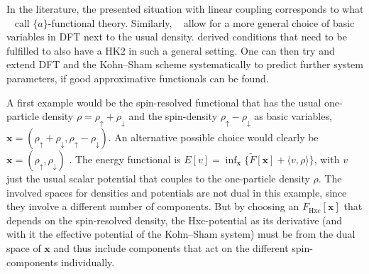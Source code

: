 \documentclass[journal=apcach,manuscript=article,layout=twocolumn]{achemso}
\newcommand{\FHxc}{F_\mathrm{Hxc}}
\newcommand{\xx}{\mathbf{x}}
\newcommand{\changed}[1] {{ {#1}}} %
\begin{document}
In the literature, the presented situation with linear coupling corresponds to what \citeauthor{Schoenhammer1995}~\cite{Schoenhammer1995} call $\{a\}$-functional theory.
Similarly, \citeauthor{higuchi2004arbitrary}~\cite{higuchi2004arbitrary,higuchi2004arbitrary2} allow for a more general choice of basic variables in DFT next to the usual density. 
\changed{\citet{xu2022extensibility} derived conditions that need to be fulfilled to also have a HK2 in such a general setting.}
\changed{One can then try and} extend DFT and the Kohn--Sham scheme systematically to predict further system parameters, if good approximative functionals can be found.

A first example would be the spin-resolved functional that has the usual one-particle density $\rho = \rho_{\uparrow} + \rho_{\downarrow}$ and the spin-density $\rho_{\uparrow} - \rho_{\downarrow}$ as basic variables, $\xx =  (\rho_{\uparrow} + \rho_{\downarrow},\rho_{\uparrow} - \rho_{\downarrow})$. An alternative possible choice would clearly be $\xx =  (\rho_{\uparrow},\rho_{\downarrow})$ \cite[Section~8.1]{parr}. The energy functional is $E[v] = \inf_\xx \{\tilde F[\xx] + \langle v,\rho \rangle\}$, with $v$ just the usual scalar potential that couples to the one-particle density $\rho$. The involved spaces for densities and potentials are not dual in this example, since they involve a different number of components. But by choosing an $\FHxc[\xx]$ that depends on the spin-resolved density, the Hxc-potential as its derivative (and with it the effective potential of the Kohn--Sham system) must be from the dual space of $\xx$ and thus include components that act on the different spin-components individually.
\end{document}
